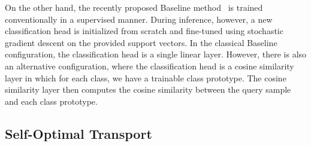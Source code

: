 \documentclass{article}
\begin{document}
On the other hand, the recently proposed Baseline method~\cite{baseline} is trained conventionally in a supervised manner.  During inference, however, a new classification head is initialized from scratch and fine-tuned using stochastic gradient  descent on the provided support vectors. In the classical Baseline configuration, the classification head is a single linear layer. However, there is also an alternative configuration, where the classification head is a cosine similarity layer in which for each  class, we have a trainable class prototype. The cosine similarity layer then computes the cosine similarity between the query sample  and each class prototype.





\subsection{Self-Optimal Transport}

\end{document}
